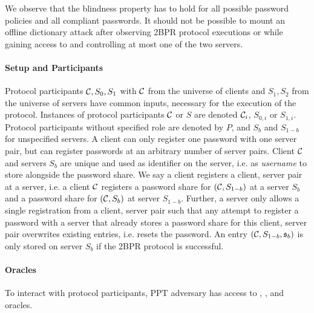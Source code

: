 We observe that the blindness property has to hold for all possible password policies and all compliant passwords. It should not be possible to mount an offline dictionary attack after observing 2BPR protocol executions or while gaining access to and controlling at most one of the two servers.

\paragraph{Setup and Participants}
Protocol participants $\mathcal{C},S_0,S_1$ with $\mathcal{C}$ from the universe of clients and $S_1,S_2$ from the universe of servers have common inputs, necessary for the execution of the protocol. %
Instances of protocol participants $\mathcal{C}$ or $S$ are denoted $\mathcal{C}_i$, $S_{0,i}$ or $S_{1,i}$.
Protocol participants without specified role are denoted by $P$, and $S_b$ and $S_{1-b}$ for unspecified servers.
A client can only register one password with one server pair, but can register passwords at an arbitrary number of server pairs.
Client $\mathcal{C}$ and servers $S_b$ are unique and used as identifier on the server, i.e. as \emph{username} to store alongside the password share.
We say a client registers a client, server pair at a server, i.e. a client $\mathcal{C}$ registers a password share for $(\mathcal{C}, S_{1-b})$ at a server $S_b$ and a password share for $(\mathcal{C},S_{b})$ at server $S_{1-b}$.
Further, a server only allows a single registration from a client, server pair such that any attempt to register a password with a server that already stores a password share for this client, server pair overwrites existing entries, i.e. resets the password.
An entry $(\mathcal{C},S_{1-b},\mathfrak{s}_b)$ is only stored on server $S_b$ if the 2BPR protocol is successful.

\paragraph{Oracles}
To interact with protocol participants, PPT adversary \cA has access to \Setup, \Send, \Execute and \Corrupt oracles.

